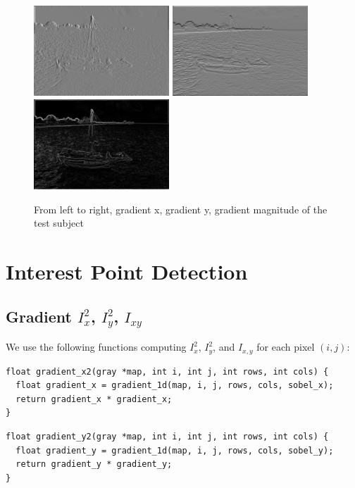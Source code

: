 \documentclass[a4paper, 10pt]{article}
\begin{document}
\begin{figure}[!htb]
\centering
\includegraphics[width=192px]{boat3x3_5_grad_x.png}
\includegraphics[width=192px]{boat3x3_5_grad_y.png}
\includegraphics[width=192px]{boat3x3_5_grad_mag.png}
\caption{From left to right, gradient x, gradient y, gradient magnitude of the test subject}
\label{fig-gradient}
\end{figure}


\section{Interest Point Detection}
\subsection{Gradient $I^2_x$, $I^2_y$, $I_{xy}$}
We use the following functions computing $I^2_x$, $I^2_y$, and $I_{x,y}$ for each pixel $(i, j)$:

\begin{lstlisting}[frame=single]
float gradient_x2(gray *map, int i, int j, int rows, int cols) {
  float gradient_x = gradient_1d(map, i, j, rows, cols, sobel_x);
  return gradient_x * gradient_x;
}
\end{lstlisting}

\begin{lstlisting}[frame=single]
float gradient_y2(gray *map, int i, int j, int rows, int cols) {
  float gradient_y = gradient_1d(map, i, j, rows, cols, sobel_y);
  return gradient_y * gradient_y;
}
\end{lstlisting}
\end{document}
